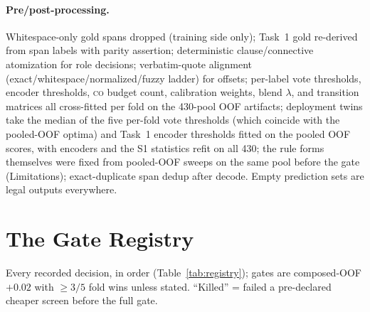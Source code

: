 \documentclass[11pt]{article}
\newcommand{\lab}[1]{\textsc{#1}}
\newcommand{\co}{\lab{co}}
\begin{document}
\paragraph{Pre/post-processing.} Whitespace-only gold spans dropped
(training side only); Task~1 gold re-derived from span labels with parity
assertion; deterministic clause/connective atomization for role
decisions; verbatim-quote alignment (exact/whitespace/normalized/fuzzy
ladder) for offsets; per-label vote thresholds, encoder thresholds, \co{}
budget count, calibration weights, blend $\lambda$, and transition
matrices all cross-fitted per fold on the 430-pool OOF artifacts;
deployment twins take the median of the five per-fold vote thresholds
(which coincide with the pooled-OOF optima) and Task~1 encoder
thresholds fitted on the pooled OOF scores, with encoders and the S1
statistics refit on all 430; the rule forms themselves were fixed from
pooled-OOF sweeps on the same pool before the gate (Limitations); exact-duplicate span dedup after decode. Empty
prediction sets are legal outputs everywhere.

\section{The Gate Registry}
\label{app:gates}

Every recorded decision, in order (Table~\ref{tab:registry}); gates are
composed-OOF $+0.02$ with
${\geq}3/5$ fold wins unless stated. ``Killed'' = failed a pre-declared
cheaper screen before the full gate.
\end{document}
